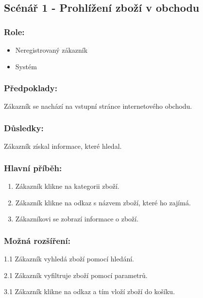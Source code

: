 \documentclass[11pt,twoside,a4paper]{book}
\begin{document}
\subsection{Scénář 1 - Prohlížení zboží v obchodu}
\subsubsection*{Role:}

\begin{itemize}
\item Neregistrovaný zákazník
\item Systém
\end{itemize}

\subsubsection*{Předpoklady:}

Zákazník se nachází na vstupní stránce internetového obchodu.

\subsubsection*{Důsledky:}

Zákazník získal informace, které hledal.

\subsubsection*{Hlavní příběh:}
\begin{enumerate}
\item Zákazník klikne na kategorii zboží.
\item Zákazník klikne na odkaz s názvem zboží, které ho zajímá.
\item Zákazníkovi se zobrazí informace o zboží.
\end{enumerate}

\subsubsection*{Možná rozšíření:}

\begin{description}
\item 1.1 Zákazník vyhledá zboží pomocí hledání.
\item 2.1 Zákazník vyfiltruje zboží pomocí parametrů.
\item 3.1 Zákazník klikne na odkaz  a tím vloží zboží do košíku.
\end{description}
\end{document}
